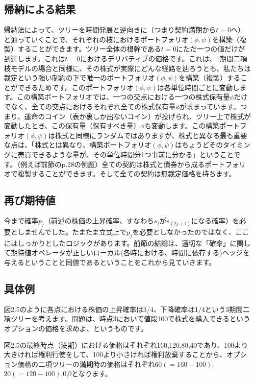 \documentclass[uplatex,a4j,12pt,dvipdfmx]{jsarticle}
\begin{document}
\subsection{帰納による結果}
帰納法によって、ツリーを時間発展と逆向きに（つまり契約満期から$t=0$へ）と辿っていくことで、それぞれの枝におけるポートフォリオ$(\phi,\psi)$を構築（複製）することができます。ツリー全体の根幹である$t=0$にただ一つの値だけが到達します。これは$t=0$におけるデリバティブの価格です。これは、1期間二項枝モデルの場合と同様に、その株式が実際にどんな経路を辿ろうとも、私たちは裁定という強い制約の下で唯一のポートフォリオ$(\phi,\psi)$を構築（複製）することができるためです。このポートフォリオ$(\phi,\psi)$は各単位時間ごとに変動します。この構築ポートフォリオでは、一つの交点における一つの株式保有量$\phi$だけでなく、全ての交点におけるそれぞれ全ての株式保有量$\phi$が求まっています。つまり、運命のコイン（表か裏しか出ないコイン）が投げられ、ツリー上で株式が変動したとき、この保有量（保有すべき量）$\phi$も変動します。この構築ポートフォリオ$(\phi,\psi)$は株式と同様にランダムではありますが、株式と異なる最も重要な点は、「株式とは異なり、構築ポートフォリオ$(\phi,\psi)$はちょうどそのタイミングに売買できるような量が、その単位時間分1つ事前に分かる」ということです。（例えば前節のp.28の例題）全ての契約は株式と債券から成るポートフォリオで複製することができます。そして全ての契約は無裁定価格を持ちます。

\subsection{再び期待値}
今まで確率$p_j$（前述の株価の上昇確率、すなわち$s_j$が$s_{(2j+1)}$になる確率）を必要としませんでした。たまたま立式上で$p_j$を必要としなかったのではなく、ここにはしっかりとしたロジックがあります。前節の結論は、適切な「確率」に関して期待値オペレータが正しいローカル(各時における、時間に依存する)ヘッジを与えるということと同値であるということをこれから見ていきます。

\subsection{具体例}
図2.5のように各点における株価の上昇確率は3/4、下降確率は1/4という3期間二項ツリーを考えます。問題は、時点3において値段100で株式を購入できるというオプションの価格を求めよ、というものです。

図2.5の最終時点（満期）における価格はそれぞれ160,120,80,40であり、100より大きければ権利行使をして、100より小さければ権利放棄することから、オプション価格の二項ツリーの満期時の価格はそれぞれ$60(=160-100)$,$20(=120-100)$,$0$,$0$となります。
\end{document}
